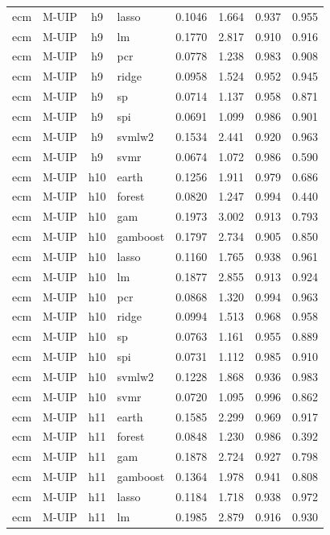 \begin{ThreePartTable}
\begin{longtable}[t]{llclcccc}
ecm & M-UIP & h9 & lasso & 0.1046 & 1.664 & 0.937 & 0.955\\
ecm & M-UIP & h9 & lm & 0.1770 & 2.817 & 0.910 & 0.916\\
ecm & M-UIP & h9 & pcr & 0.0778 & 1.238 & 0.983 & 0.908\\
ecm & M-UIP & h9 & ridge & 0.0958 & 1.524 & 0.952 & 0.945\\
ecm & M-UIP & h9 & sp & 0.0714 & 1.137 & 0.958 & 0.871\\
ecm & M-UIP & h9 & spi & 0.0691 & 1.099 & 0.986 & 0.901\\
ecm & M-UIP & h9 & svmlw2 & 0.1534 & 2.441 & 0.920 & 0.963\\
ecm & M-UIP & h9 & svmr & 0.0674 & 1.072 & 0.986 & 0.590\\
\addlinespace
ecm & M-UIP & h10 & earth & 0.1256 & 1.911 & 0.979 & 0.686\\
ecm & M-UIP & h10 & forest & 0.0820 & 1.247 & 0.994 & 0.440\\
ecm & M-UIP & h10 & gam & 0.1973 & 3.002 & 0.913 & 0.793\\
ecm & M-UIP & h10 & gamboost & 0.1797 & 2.734 & 0.905 & 0.850\\
ecm & M-UIP & h10 & lasso & 0.1160 & 1.765 & 0.938 & 0.961\\
ecm & M-UIP & h10 & lm & 0.1877 & 2.855 & 0.913 & 0.924\\
ecm & M-UIP & h10 & pcr & 0.0868 & 1.320 & 0.994 & 0.963\\
ecm & M-UIP & h10 & ridge & 0.0994 & 1.513 & 0.968 & 0.958\\
ecm & M-UIP & h10 & sp & 0.0763 & 1.161 & 0.955 & 0.889\\
ecm & M-UIP & h10 & spi & 0.0731 & 1.112 & 0.985 & 0.910\\
ecm & M-UIP & h10 & svmlw2 & 0.1228 & 1.868 & 0.936 & 0.983\\
ecm & M-UIP & h10 & svmr & 0.0720 & 1.095 & 0.996 & 0.862\\
\addlinespace
ecm & M-UIP & h11 & earth & 0.1585 & 2.299 & 0.969 & 0.917\\
ecm & M-UIP & h11 & forest & 0.0848 & 1.230 & 0.986 & 0.392\\
ecm & M-UIP & h11 & gam & 0.1878 & 2.724 & 0.927 & 0.798\\
ecm & M-UIP & h11 & gamboost & 0.1364 & 1.978 & 0.941 & 0.808\\
ecm & M-UIP & h11 & lasso & 0.1184 & 1.718 & 0.938 & 0.972\\
ecm & M-UIP & h11 & lm & 0.1985 & 2.879 & 0.916 & 0.930\\

\end{longtable}
\end{ThreePartTable}
